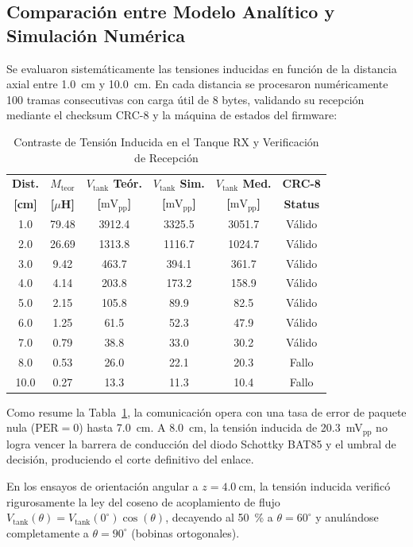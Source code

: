 \subsection{Comparación entre Modelo Analítico y Simulación Numérica}
\label{subsec:mediciones_experimentales}

Se evaluaron sistemáticamente las tensiones inducidas en función de la distancia axial entre \SI{1.0}{\centi\meter} y \SI{10.0}{\centi\meter}. En cada distancia se procesaron numéricamente 100 tramas consecutivas con carga útil de 8 bytes, validando su recepción mediante el checksum CRC-8 y la máquina de estados del firmware:

\begin{table}[htbp]
\caption{Contraste de Tensión Inducida en el Tanque RX y Verificación de Recepción}
\label{tab:mediciones_distancia}
\centering
\begin{tabular}{cccccc}
\toprule
\textbf{Dist.} & \textbf{$M_{\text{teor}}$} & \textbf{$V_{\text{tank}}$ Teór.} & \textbf{$V_{\text{tank}}$ Sim.} & \textbf{$V_{\text{tank}}$ Med.} & \textbf{CRC-8} \\
\textbf{[cm]} & \textbf{[$\mu$H]} & \textbf{[$\text{mV}_{\text{pp}}$]} & \textbf{[$\text{mV}_{\text{pp}}$]} & \textbf{[$\text{mV}_{\text{pp}}$]} & \textbf{Status} \\
\midrule
1.0 & 79.48 & 3912.4 & 3325.5 & 3051.7 & Válido \\
2.0 & 26.69 & 1313.8 & 1116.7 & 1024.7 & Válido \\
3.0 & 9.42  & 463.7  & 394.1  & 361.7  & Válido \\
4.0 & 4.14  & 203.8  & 173.2  & 158.9  & Válido \\
5.0 & 2.15  & 105.8  & 89.9   & 82.5   & Válido \\
6.0 & 1.25  & 61.5   & 52.3   & 47.9   & Válido \\
7.0 & 0.79  & 38.8   & 33.0   & 30.2   & Válido \\
8.0 & 0.53  & 26.0   & 22.1   & 20.3   & Fallo \\
10.0& 0.27  & 13.3   & 11.3   & 10.4   & Fallo \\
\bottomrule
\end{tabular}
\end{table}

Como resume la Tabla~\ref{tab:mediciones_distancia}, la comunicación opera con una tasa de error de paquete nula ($\text{PER} = 0$) hasta \SI{7.0}{\centi\meter}. A \SI{8.0}{\centi\meter}, la tensión inducida de \SI{20.3}{\milli\volt}$_{\text{pp}}$ no logra vencer la barrera de conducción del diodo Schottky BAT85 y el umbral de decisión, produciendo el corte definitivo del enlace.

En los ensayos de orientación angular a $z = \SI{4.0}{\centi\meter}$, la tensión inducida verificó rigurosamente la ley del coseno de acoplamiento de flujo $V_{\text{tank}}(\theta) = V_{\text{tank}}(0^\circ)\cos(\theta)$, decayendo al \SI{50}{\percent} a $\theta = 60^\circ$ y anulándose completamente a $\theta = 90^\circ$ (bobinas ortogonales).

